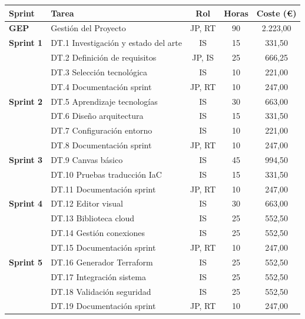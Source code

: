 \documentclass{article}
\begin{document}
    \begin{table}[H]
    \centering
    \scriptsize
    \begin{tabular}{llccc}
    \toprule
    \textbf{Sprint} & \textbf{Tarea} & \textbf{Rol} & \textbf{Horas} & \textbf{Coste (\euro)} \\
    \midrule
    
    \textbf{GEP} & Gestión del Proyecto & JP, RT & 90 & 2.223,00 \\

    \midrule

    \textbf{Sprint 1} & DT.1 Investigación y estado del arte & IS & 15 & 331,50 \\
    & DT.2 Definición de requisitos & JP, IS & 25 & 666,25 \\
    & DT.3 Selección tecnológica & IS & 10 & 221,00 \\
    & DT.4 Documentación sprint & JP, RT & 10 & 247,00 \\
    
    \midrule
    
    \textbf{Sprint 2} & DT.5 Aprendizaje tecnologías & IS & 30 & 663,00 \\
    & DT.6 Diseño arquitectura & IS & 15 & 331,50 \\
    & DT.7 Configuración entorno & IS & 10 & 221,00 \\
    & DT.8 Documentación sprint & JP, RT & 10 & 247,00 \\
    
    \midrule
    
    \textbf{Sprint 3} & DT.9 Canvas básico & IS & 45 & 994,50 \\
    & DT.10 Pruebas traducción IaC & IS & 15 & 331,50 \\
    & DT.11 Documentación sprint & JP, RT & 10 & 247,00 \\
    
    \midrule
    
    \textbf{Sprint 4} & DT.12 Editor visual & IS & 30 & 663,00 \\
    & DT.13 Biblioteca cloud & IS & 25 & 552,50 \\
    & DT.14 Gestión conexiones & IS & 25 & 552,50 \\
    & DT.15 Documentación sprint & JP, RT & 10 & 247,00 \\
    
    \midrule
    
    \textbf{Sprint 5} & DT.16 Generador Terraform & IS & 25 & 552,50 \\
    & DT.17 Integración sistema & IS & 25 & 552,50 \\
    & DT.18 Validación seguridad & IS & 25 & 552,50 \\
    & DT.19 Documentación sprint & JP, RT & 10 & 247,00 \\
    

\end{tabular}
\end{table}
\end{document}
